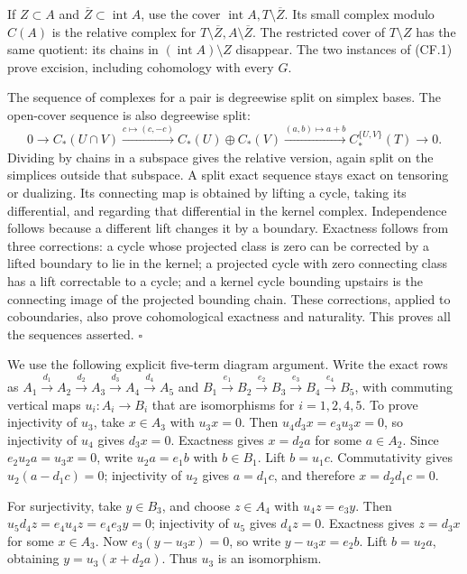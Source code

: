 \documentclass[
  11pt,
]{article}
\begin{document}
If \(Z\subset A\) and \(\overline Z\subset\operatorname{int}A\), use the
cover \(\operatorname{int}A,T\setminus\overline Z\). Its small complex
modulo \(C(A)\) is the relative complex for
\(T\setminus\overline Z,A\setminus\overline Z\). The restricted cover of
\(T\setminus Z\) has the same quotient: its chains in
\((\operatorname{int}A)\setminus Z\) disappear. The two instances of
(CF.1) prove excision, including cohomology with every \(G\).

The sequence of complexes for a pair is degreewise split on simplex
bases. The open-cover sequence is also degreewise split: \[
0\longrightarrow C_*(U\cap V)
\xrightarrow{c\mapsto(c,-c)} C_*(U)\oplus C_*(V)
\xrightarrow{(a,b)\mapsto a+b} C_*^{\{U,V\}}(T)
\longrightarrow0.
\tag{CF.2}
\] Dividing by chains in a subspace gives the relative version, again
split on the simplices outside that subspace. A split exact sequence
stays exact on tensoring or dualizing. Its connecting map is obtained by
lifting a cycle, taking its differential, and regarding that
differential in the kernel complex. Independence follows because a
different lift changes it by a boundary. Exactness follows from three
corrections: a cycle whose projected class is zero can be corrected by a
lifted boundary to lie in the kernel; a projected cycle with zero
connecting class has a lift correctable to a cycle; and a kernel cycle
bounding upstairs is the connecting image of the projected bounding
chain. These corrections, applied to coboundaries, also prove
cohomological exactness and naturality. This proves all the sequences
asserted. \(\square\)

We use the following explicit five-term diagram argument. Write the
exact rows as
\(A_1\xrightarrow{d_1}A_2\xrightarrow{d_2}A_3\xrightarrow{d_3}A_4\xrightarrow{d_4}A_5\)
and
\(B_1\xrightarrow{e_1}B_2\xrightarrow{e_2}B_3\xrightarrow{e_3}B_4\xrightarrow{e_4}B_5\),
with commuting vertical maps \(u_i:A_i\to B_i\) that are isomorphisms
for \(i=1,2,4,5\). To prove injectivity of \(u_3\), take \(x\in A_3\)
with \(u_3x=0\). Then \(u_4d_3x=e_3u_3x=0\), so injectivity of \(u_4\)
gives \(d_3x=0\). Exactness gives \(x=d_2a\) for some \(a\in A_2\).
Since \(e_2u_2a=u_3x=0\), write \(u_2a=e_1b\) with \(b\in B_1\). Lift
\(b=u_1c\). Commutativity gives \(u_2(a-d_1c)=0\); injectivity of
\(u_2\) gives \(a=d_1c\), and therefore \(x=d_2d_1c=0\).

For surjectivity, take \(y\in B_3\), and choose \(z\in A_4\) with
\(u_4z=e_3y\). Then \(u_5d_4z=e_4u_4z=e_4e_3y=0\); injectivity of
\(u_5\) gives \(d_4z=0\). Exactness gives \(z=d_3x\) for some
\(x\in A_3\). Now \(e_3(y-u_3x)=0\), so write \(y-u_3x=e_2b\). Lift
\(b=u_2a\), obtaining \(y=u_3(x+d_2a)\). Thus \(u_3\) is an isomorphism.
\end{document}
